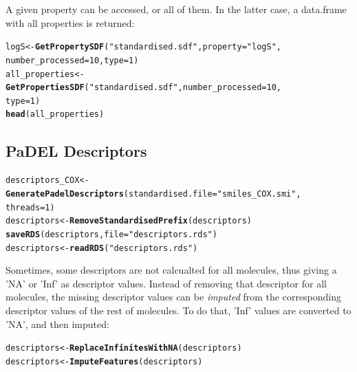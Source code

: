 \documentclass[twoside,a4wide,12pt]{article}\usepackage[]{graphicx}\usepackage[]{color}
\makeatletter
\newcommand{\hlnum}[1]{\textcolor[rgb]{0.686,0.059,0.569}{#1}}%
\newcommand{\hlstr}[1]{\textcolor[rgb]{0.192,0.494,0.8}{#1}}%
\newcommand{\hlstd}[1]{\textcolor[rgb]{0.345,0.345,0.345}{#1}}%
\newcommand{\hlkwb}[1]{\textcolor[rgb]{0.69,0.353,0.396}{#1}}%
\newcommand{\hlkwc}[1]{\textcolor[rgb]{0.333,0.667,0.333}{#1}}%
\newcommand{\hlkwd}[1]{\textcolor[rgb]{0.737,0.353,0.396}{\textbf{#1}}}%
\newenvironment{kframe}{%
 \def\at@end@of@kframe{}%
 \ifinner\ifhmode%
  \def\at@end@of@kframe{\end{minipage}}%
  \begin{minipage}{\columnwidth}%
 \fi\fi%
 \def\FrameCommand##1{\hskip\@totalleftmargin \hskip-\fboxsep
 \colorbox{shadecolor}{##1}\hskip-\fboxsep
     \hskip-\linewidth \hskip-\@totalleftmargin \hskip\columnwidth}%
 \MakeFramed {\advance\hsize-\width
   \@totalleftmargin\z@ \linewidth\hsize
   \@setminipage}}%
 {\par\unskip\endMakeFramed%
 \at@end@of@kframe}
\newenvironment{knitrout}{}{} %
\makeatother
\begin{document}
A given property can be accessed, or all of them. In the latter case, a data.frame with all properties is returned:
\begin{knitrout}
\color{fgcolor}\begin{kframe}
\begin{alltt}
\hlstd{logS} \hlkwb{<-} \hlkwd{GetPropertySDF}\hlstd{(}\hlstr{"standardised.sdf"}\hlstd{,} \hlkwc{property} \hlstd{=} \hlstr{"logS"}\hlstd{,}
    \hlkwc{number_processed} \hlstd{=} \hlnum{10}\hlstd{,} \hlkwc{type} \hlstd{=} \hlnum{1}\hlstd{)}
\hlstd{all_properties} \hlkwb{<-} \hlkwd{GetPropertiesSDF}\hlstd{(}\hlstr{"standardised.sdf"}\hlstd{,} \hlkwc{number_processed} \hlstd{=} \hlnum{10}\hlstd{,}
    \hlkwc{type} \hlstd{=} \hlnum{1}\hlstd{)}
\hlkwd{head}\hlstd{(all_properties)}
\end{alltt}
\end{kframe}
\end{knitrout}


\subsection{PaDEL Descriptors}
\begin{knitrout}
\color{fgcolor}\begin{kframe}
\begin{alltt}
\hlstd{descriptors_COX} \hlkwb{<-} \hlkwd{GeneratePadelDescriptors}\hlstd{(}\hlkwc{standardised.file} \hlstd{=} \hlstr{"smiles_COX.smi"}\hlstd{,}
    \hlkwc{threads} \hlstd{=} \hlnum{1}\hlstd{)}
\hlstd{descriptors} \hlkwb{<-} \hlkwd{RemoveStandardisedPrefix}\hlstd{(descriptors)}
\hlkwd{saveRDS}\hlstd{(descriptors,} \hlkwc{file} \hlstd{=} \hlstr{"descriptors.rds"}\hlstd{)}
\hlstd{descriptors} \hlkwb{<-} \hlkwd{readRDS}\hlstd{(}\hlstr{"descriptors.rds"}\hlstd{)}
\end{alltt}
\end{kframe}
\end{knitrout}


Sometimes, some descriptors are not calcualted for all molecules, thus giving a 'NA' or 'Inf' as descriptor values. Instead of removing that descriptor for all molecules, the missing descriptor values can be {\it imputed} from the corresponding descriptor values of the rest of molecules. To do that, 'Inf' values are converted to 'NA', and then imputed:

\begin{knitrout}
\color{fgcolor}\begin{kframe}
\begin{alltt}
\hlstd{descriptors} \hlkwb{<-} \hlkwd{ReplaceInfinitesWithNA}\hlstd{(descriptors)}
\hlstd{descriptors} \hlkwb{<-} \hlkwd{ImputeFeatures}\hlstd{(descriptors)}
\end{alltt}
\end{kframe}
\end{knitrout}
\end{document}
